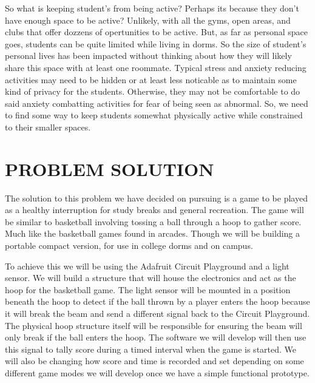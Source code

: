 \documentclass[12pt]{article}
\begin{document}
So what is keeping student's from being active? Perhaps its because they don't have enough space to be active? Unlikely, with all the gyms, open areas, and clubs that offer dozzens of opertunities to be active. But, as far as personal space goes, students can be quite limited while living in dorms. So the size of student's personal lives has been impacted without thinking about how they will likely share this space with at least one roommate. Typical stress and anxiety reducing activities may need to be hidden or at least less noticable as to maintain some kind of privacy for the students. Otherwise, they may not be comfortable to do said anxiety combatting activities for fear of being seen as abnormal. So, we need to find some way to keep students somewhat physically active while constrained to their smaller spaces.

\section{PROBLEM SOLUTION}
The solution to this problem we have decided on pursuing is a game to be played as a healthy interruption for study breaks and general recreation. The game will be similar to basketball involving tossing a ball through a hoop to gather score. Much like the basketball games found in arcades. Though we will be building a portable compact version, for use in college dorms and on campus.

To achieve this we will be using the Adafruit Circuit Playground and a light sensor. We will build a structure that will house the electronics and act as the hoop for the basketball game. The light sensor will be mounted in a position beneath the hoop to detect if the ball thrown by a player enters the hoop because it will break the beam and send a different signal back to the Circuit Playground. The physical hoop structure itself will be responsible for ensuring the beam will only break if the ball enters the hoop. The software we will develop will then use this signal to tally score during a timed interval when the game is started. We will also be changing how score and time is recorded and set depending on some different game modes we will develop once we have a simple functional prototype.
\end{document}
